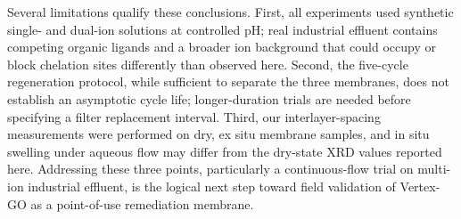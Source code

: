 Several limitations qualify these conclusions. First, all experiments used synthetic single- and dual-ion solutions at controlled pH; real industrial effluent contains competing organic ligands and a broader ion background that could occupy or block chelation sites differently than observed here. Second, the five-cycle regeneration protocol, while sufficient to separate the three membranes, does not establish an asymptotic cycle life; longer-duration trials are needed before specifying a filter replacement interval. Third, our interlayer-spacing measurements were performed on dry, ex situ membrane samples, and in situ swelling under aqueous flow may differ from the dry-state XRD values reported here. Addressing these three points, particularly a continuous-flow trial on multi-ion industrial effluent, is the logical next step toward field validation of Vertex-GO as a point-of-use remediation membrane.
